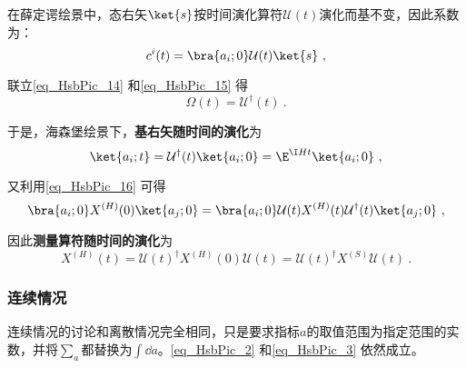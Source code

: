 在薛定谔绘景中，态右矢$\ket{s}$按时间演化算符$\mathcal{U}(t)$演化而基不变，因此系数为：
\begin{equation}\label{eq_HsbPic_15}
c^i(t) = \bra{a_i; 0}\mathcal{U}(t)\ket{s}~,
\end{equation}

联立\autoref{eq_HsbPic_14} 和\autoref{eq_HsbPic_15} 得
\begin{equation}
\mathcal{\Omega}(t)=\mathcal{U}^\dagger(t)~.
\end{equation}




于是，海森堡绘景下，\textbf{基右矢随时间的演化}为
\begin{equation}\label{eq_HsbPic_3}
\ket{a_i; t} = \mathcal{U}^\dagger(t)\ket{a_i; 0} = \E^{\I H t}\ket{a_i; 0}~,
\end{equation}

又利用\autoref{eq_HsbPic_16} 可得
\begin{equation}
\bra{a_i; 0}X^{(H)}(0)\ket{a_j; 0} = \bra{a_i; 0}\mathcal{U}(t)X^{(H)}(t)\mathcal{U}^\dagger(t)\ket{a_j; 0}~,
\end{equation}

因此\textbf{测量算符随时间的演化}为
\begin{equation}\label{eq_HsbPic_2}
X^{(H)}(t) = \mathcal{U}(t)^\dagger X^{(H)}(0) \mathcal{U}(t) = \mathcal{U}(t)^\dagger X^{(S)} \mathcal{U}(t)~.
\end{equation}




\subsubsection{连续情况}

连续情况的讨论和离散情况完全相同，只是要求指标$a$的取值范围为指定范围的实数，并将$\sum_a$都替换为$\int \dd a$。\autoref{eq_HsbPic_2} 和\autoref{eq_HsbPic_3} 依然成立。


